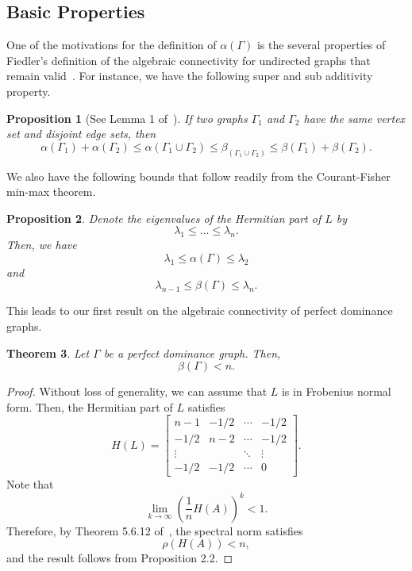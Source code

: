 \documentclass{article}
\newtheorem{theorem}{Theorem}[section]
\newtheorem{proposition}[theorem]{Proposition}
\begin{document}
\subsection{Basic Properties}
One of the motivations for the definition of $\alpha(\Gamma)$ is the several properties of Fiedler's definition of the algebraic connectivity for undirected graphs that remain valid~\cite{Fiedler1973}.
For instance, we have the following super and sub additivity property.

\begin{proposition}[See Lemma 1 of~\cite{Wu2005-1}]
If two graphs $\Gamma_{1}$ and $\Gamma_{2}$ have the same vertex set and disjoint edge sets, then
\[
\alpha(\Gamma_{1})+\alpha(\Gamma_{2})\leq\alpha(\Gamma_{1}\cup\Gamma_{2})\leq\beta_(\Gamma_{1}\cup\Gamma_{2})\leq\beta(\Gamma_{1})+\beta(\Gamma_{2}).
\]
\end{proposition}

We also have the following bounds that follow readily from the Courant-Fisher min-max theorem.

\begin{proposition}
Denote the eigenvalues of the Hermitian part of $L$ by
\[
\lambda_{1}\leq\ldots\leq\lambda_{n}.
\]
Then, we have
\[
\lambda_{1}\leq\alpha(\Gamma)\leq\lambda_{2}
\]
and
\[
\lambda_{n-1}\leq\beta(\Gamma)\leq\lambda_{n}.
\]
\end{proposition}

This leads to our first result on the algebraic connectivity of perfect dominance graphs.

\begin{theorem}
Let $\Gamma$ be a perfect dominance graph.
Then,
\[
\beta(\Gamma)<n.
\]
\end{theorem}
\begin{proof}
Without loss of generality, we can assume that $L$ is in Frobenius normal form.
Then, the Hermitian part of $L$ satisfies
\[
H(L)=\begin{bmatrix} n-1 & -1/2 & \cdots & -1/2 \\
				-1/2 & n-2 & \cdots & -1/2 \\
				\vdots & & \ddots & \vdots \\
				-1/2 & -1/2 & \cdots & 0 \end{bmatrix}.
\]
Note that
\[
\lim_{k\rightarrow\infty}\left(\frac{1}{n}H(A)\right)^{k} < 1.
\]
Therefore, by Theorem 5.6.12 of~\cite{Horn2013}, the spectral norm satisfies
\[
\rho(H(A))<n,
\]
and the result follows from Proposition 2.2. 
\end{proof}
\end{document}
